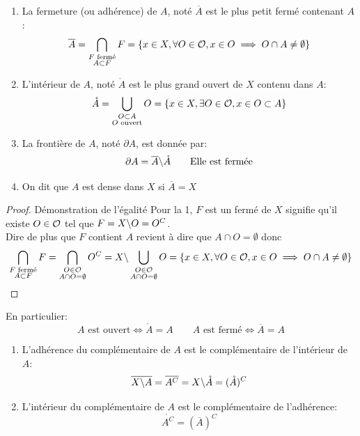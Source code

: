 \documentclass[]{report}
\begin{document}
    \begin{df}{}{}
        \begin{enumerate}
            \item La fermeture (ou adhérence) de $A$, noté $\overline{A}$ est le plus petit fermé contenant $A$:
            \[\overline{A}=\bigcap_{\substack{F\text{ fermé}\\ A\subset F}}F=\{x\in X,\forall O\in\mathcal{O},x\in O\implies O\cap A\neq \emptyset\}\]
            \item L'intérieur de $A$, noté $\mathring{A}$ est le plus grand ouvert de $X$ contenu dans $A$:
            \[\mathring{A}=\bigcup_{\substack{O\subset A\\ O\text{ ouvert}}}O=\{x\in X,\exists O\in \mathcal{O},x\in O\subset A\}\]
            \item La frontière de $A$, noté $\partial A$, est donnée par:
            \[\partial A=\overline{A}\backslash \mathring{A}\qquad \text{Elle est fermée}\]
            \item On dit que $A$ est dense dans $X$ si $\overline{A}=X$
        \end{enumerate}
    \end{df}

    \begin{proof}{Démonstration de l'égalité}{}
        Pour la 1, $F$ est un fermé de $X$ signifie qu'il existe $O\in\mathcal{O}$ tel que $F=X\backslash O=O^C$.\\
        Dire de plus que $F$ contient $A$ revient à dire que $A\cap O=\emptyset$ donc
        \[\bigcap_{\substack{F\text{ fermé}\\ A\subset F}}F=\bigcap_{\substack{O\in\mathcal{O}\\ A\cap O=\emptyset}}O^C=X\backslash \bigcup_{\substack{O\in\mathcal{O}\\ A\cap O=\emptyset}}O=\{x\in X,\forall O\in \mathcal{O},x\in O\implies O\cap A\neq \emptyset\}\]
    \end{proof}

    \begin{re}{}{}
        En particulier:
        \[A\text{ est ouvert}\iff \mathring{A}=A\qquad A\text{ est fermé}\iff \overline{A}=A\]
    \end{re}

    \begin{prop}{}{}
        \begin{enumerate}
            \item L'adhérence du complémentaire de $A$ est le complémentaire de l'intérieur de $A$:
            \[\overline{X\backslash A}=\overline{A^C}=X\backslash\mathring{A}=(\mathring{A})^C\]
            \item L'intérieur du complémentaire de $A$ est le complémentaire de l'adhérence:
            \[\mathring{A^C}=(\overline{A})^C\]
        \end{enumerate}
    \end{prop}
\end{document}
